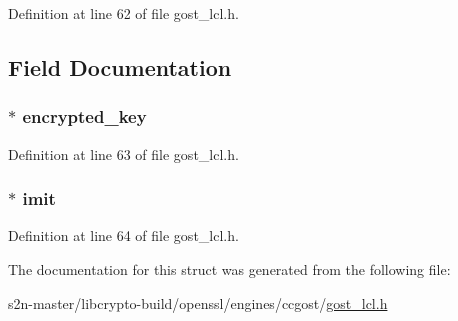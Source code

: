 Definition at line 62 of file gost\+\_\+lcl.\+h.



\subsection{Field Documentation}
\subsubsection[{\texorpdfstring{encrypted\+\_\+key}{encrypted_key}}]{$\ast$ encrypted\+\_\+key}\hypertarget{struct_g_o_s_t___k_e_y___i_n_f_o_a8160e48d5f00b831547bd1c9eadec0c0}{}\label{struct_g_o_s_t___k_e_y___i_n_f_o_a8160e48d5f00b831547bd1c9eadec0c0}


Definition at line 63 of file gost\+\_\+lcl.\+h.

\subsubsection[{\texorpdfstring{imit}{imit}}]{$\ast$ imit}\hypertarget{struct_g_o_s_t___k_e_y___i_n_f_o_a79f1a28e806a36020b87c992cacd82b9}{}\label{struct_g_o_s_t___k_e_y___i_n_f_o_a79f1a28e806a36020b87c992cacd82b9}


Definition at line 64 of file gost\+\_\+lcl.\+h.



The documentation for this struct was generated from the following file\+:\begin{DoxyCompactItemize}
\item 
s2n-\/master/libcrypto-\/build/openssl/engines/ccgost/\hyperlink{gost__lcl_8h}{gost\+\_\+lcl.\+h}\end{DoxyCompactItemize}
